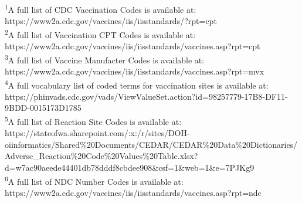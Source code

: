 \documentclass[
  letterpaper,
  DIV=11,
  numbers=noendperiod]{scrreprt}
\begin{document}
\begin{minipage}{\linewidth}
\textsuperscript{1}A full list of CDC Vaccination Codes is available at: https://www2a.cdc.gov/vaccines/iis/iisstandards/?rpt=cpt\\
\textsuperscript{2}A full list of Vaccination CPT Codes is available at: https://www2a.cdc.gov/vaccines/iis/iisstandards/vaccines.asp?rpt=cpt\\
\textsuperscript{3}A full list of Vaccine Manufacter Codes is available at: https://www2a.cdc.gov/vaccines/iis/iisstandards/vaccines.asp?rpt=mvx\\
\textsuperscript{4}A full vocabulary list of coded terms for vaccination sites is available at: https://phinvads.cdc.gov/vads/ViewValueSet.action?id=98257779-17B8-DF11-9BDD-0015173D1785\\
\textsuperscript{5}A full list of Reaction Site Codes is available at: https://stateofwa.sharepoint.com/:x:/r/sites/DOH-oiinformatics/Shared\%20Documents/CEDAR/CEDAR\%20Data\%20Dictionaries/Adverse\_Reaction\%20Code\%20Values\%20Table.xlsx?d=w7ac90aeede44401db78dddf8cbdee908\&csf=1\&web=1\&e=7PJKg9\\
\textsuperscript{6}A full list of NDC Number Codes is available at: https://www2a.cdc.gov/vaccines/iis/iisstandards/vaccines.asp?rpt=ndc\\
\end{minipage}
\end{document}
